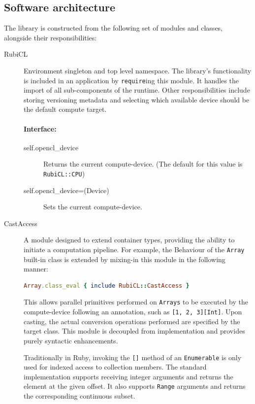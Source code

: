 \subsection{Software architecture}
The library is constructed from the following set of modules and classes, alongside their responsibilities:
\begin{description}
  \item[RubiCL] Environment singleton and top level namespace.
The library's functionality is included in an application by \verb|require|ing this module. It handles the import of all sub-components of the runtime.
Other responsibilities include storing versioning metadata and selecting which available device should be the default compute target.

\paragraph*{Interface:}
\begin{description}
  \item[self.opencl\_device] Returns the current compute-device. (The default for this value is \verb|RubiCL::CPU|)
  \item[self.opencl\_device=(Device)] Sets the current compute-device.
\end{description}

  \item[CastAccess] A module designed to extend container types, providing the ability to initiate a computation pipeline.
    For example, the Behaviour of the \verb|Array| built-in class is extended by mixing-in this module in the following manner:
\begin{lstlisting}[language=Ruby]
Array.class_eval { include RubiCL::CastAccess }
\end{lstlisting}
This allows parallel primitives performed on \verb|Arrays| to be executed by the compute-device following an annotation, such as \verb|[1, 2, 3][Int]|.
Upon casting, the actual conversion operations performed are specified by the target class. This module is decoupled from implementation and provides purely syntactic enhancements.

Traditionally in Ruby, invoking the \verb|[]| method of an \verb|Enumerable| is only used for indexed access to collection members. The standard implementation supports receiving integer arguments and returns the element at the given offset. It also supports \verb|Range| arguments and returns the corresponding continuous subset.


\end{description}
